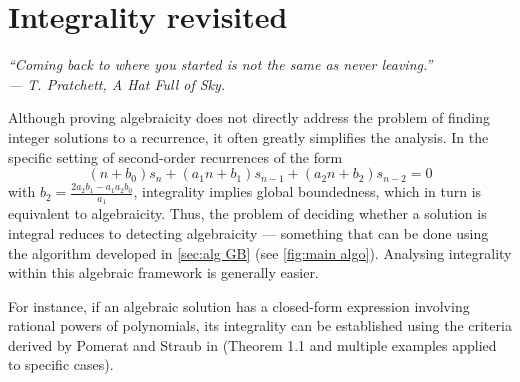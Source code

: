 \documentclass[11pt]{article}
\theoremstyle{definition}
\theoremstyle{plain}
\theoremstyle{remark}
\begin{document}
\section{Integrality revisited }\label{sec:integrality}
\begin{flushright}
\footnotesize\itshape
``Coming back to where you started is not the same as never leaving.''\\
\textup{--- T. Pratchett, \textit{A Hat Full of Sky}.}
\end{flushright}
Although proving algebraicity does not directly address the problem of finding integer solutions to a recurrence, it often greatly simplifies the analysis. In the specific setting of second-order recurrences of the form
\[(n+b_0)s_n+(a_1n+b_1)s_{n-1}+(a_2n+b_2)s_{n-2}=0\]
with $b_2 = \frac{2a_2b_1-a_1a_2b_0}{a_1}$, integrality implies global boundedness, which in turn is equivalent to algebraicity. Thus, the problem of deciding whether a solution is integral reduces to detecting algebraicity — something that can be done using the algorithm developed in \cref{sec:alg GB} (see \cref{fig:main algo}). Analysing integrality within this algebraic framework is generally easier. 

For instance, if an algebraic solution has a closed-form expression involving rational powers of polynomials, its integrality can be established using the criteria derived by Pomerat and Straub in \cite{PS24} (Theorem 1.1 and multiple examples applied to specific cases).
\end{document}
